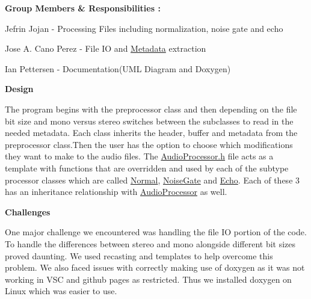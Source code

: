 {\bfseries Group Members \& Responsibilities \+:}

Jefrin Jojan -\/ Processing Files including normalization, noise gate and echo

Jose A. Cano Perez -\/ File IO and \hyperlink{structMetadata}{Metadata} extraction

Ian Pettersen -\/ Documentation(\+U\+M\+L Diagram and Doxygen)

{\bfseries Design}



The program begins with the preprocessor class and then depending on the file bit size and mono versus stereo switches between the subclasses to read in the needed metadata. Each class inherits the header, buffer and metadata from the preprocessor class.\+Then the user has the option to choose which modifications they want to make to the audio files. The \hyperlink{AudioProcessor_8h_source}{Audio\+Processor.\+h} file acts as a template with functions that are overridden and used by each of the subtype processor classes which are called \hyperlink{classNormal}{Normal}, \hyperlink{classNoiseGate}{Noise\+Gate} and \hyperlink{classEcho}{Echo}. Each of these 3 has an inheritance relationship with \hyperlink{classAudioProcessor}{Audio\+Processor} as well.

{\bfseries Challenges}

One major challenge we encountered was handling the file IO portion of the code. To handle the differences between stereo and mono alongside different bit sizes proved daunting. We used recasting and templates to help overcome this problem. We also faced issues with correctly making use of doxygen as it was not working in V\+SC and github pages as restricted. Thus we installed doxygen on Linux which was easier to use. 